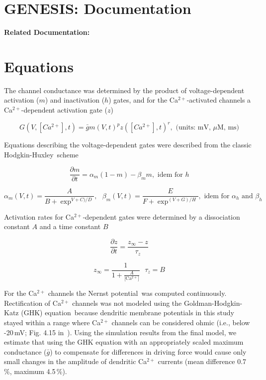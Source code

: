 \documentclass[12pt]{article}
\begin{document}
\section*{GENESIS: Documentation}

{\bf Related Documentation:}

\section*{Equations}

The channel conductance was
determined by the product of voltage-dependent activation ($m$)
and inactivation ($h$) gates, and for the Ca$^{2+}$-activated channels
a Ca$^{2+}$-dependent activation gate ($z$)

\begin{equation}
   G(V,[Ca^{2+}], t) = \bar gm(V, t)^p z([Ca^{2+}], t)^r, \mbox{        (units: mV, $\mu$M, ms)}
\end{equation}

Equations describing the voltage-dependent gates were described from the classic Hodgkin-Huxley\,\cite{hodgkin52:_quantitative_description} scheme

\begin{equation}
   \frac{\partial m}{\partial t} = \alpha_m(1-m) - \beta_mm, \mbox{        idem for $h$}
\end{equation}

\begin{equation}
   \alpha_m(V,t) = \frac{A}{B+\exp^{V+C)/D}}, \mbox{        }\beta_m(V,t) = \frac{E}{F+\exp^{(V+G)/H}}, \mbox{        idem for $\alpha_h$ and $\beta_h$}
\end{equation}

Activation rates for Ca$^{2+}$-dependent gates were determined by a dissociation constant $A$ and a time constant $B$

\begin{equation}
   \frac{\partial z}{\partial t} = \frac{z_\infty - z}{\tau_z}
\end{equation}

\begin{equation}
   z_\infty = \frac{1}{1+\frac{A}{\mbox{[Ca$^{2+}$]}}} \mbox{        }\tau_z = B
\end{equation}

For the Ca$^{2+}$ channels the Nernst potential\,\cite{Hille:1991zr} was
computed continuously. Rectification of
Ca$^{2+}$ channels was not modeled using the Goldman-Hodgkin-Katz (GHK) equation\,\cite{Hille:1991zr}
because dendritic membrane potentials in this
study stayed within a range where Ca$^{2+}$  channels can be considered
ohmic (i.e., below -20\,mV; Fig. 4.15 in\,\cite{Hille:1991zr} ). Using
the simulation results from the final model, we estimate that using
the GHK equation with an appropriately scaled maximum conductance
($\bar g$) to compensate for differences in driving force would
cause only small changes in the amplitude of dendritic Ca$^{2+}$
currents (mean difference 0.7\,\%, maximum 4.5\,\%).



\end{document}
